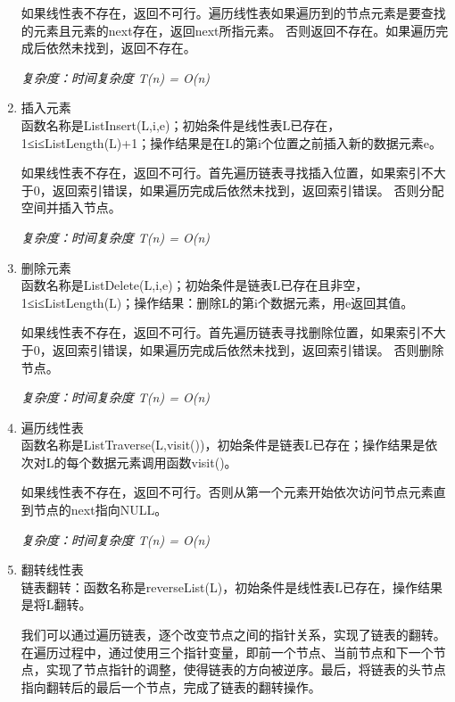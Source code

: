 \documentclass[supercite]{Experimental_Report}
\theoremstyle{definition}
\begin{document}
\begin{enumerate}
	如果线性表不存在，返回不可行。遍历线性表如果遍历到的节点元素是要查找的元素且元素的next存在，返回next所指元素。
	否则返回不存在。如果遍历完成后依然未找到，返回不存在。
	
	\emph{复杂度：时间复杂度 T(n) = O(n)}
	\item 插入元素\\
	函数名称是ListInsert(L,i,e)；初始条件是线性表L已存在，1≤i≤ListLength(L)+1；操作结果是在L的第i个位置之前插入新的数据元素e。
	
	如果线性表不存在，返回不可行。首先遍历链表寻找插入位置，如果索引不大于0，返回索引错误，如果遍历完成后依然未找到，返回索引错误。
	否则分配空间并插入节点。
	
	\emph{复杂度：时间复杂度 T(n) = O(n)}
	\item 删除元素\\
	函数名称是ListDelete(L,i,e)；初始条件是链表L已存在且非空，1≤i≤ListLength(L)；操作结果：删除L的第i个数据元素，用e返回其值。
	
	如果线性表不存在，返回不可行。首先遍历链表寻找删除位置，如果索引不大于0，返回索引错误，如果遍历完成后依然未找到，返回索引错误。
	否则删除节点。
	
	\emph{复杂度：时间复杂度 T(n) = O(n)}
	\item 遍历线性表\\
	函数名称是ListTraverse(L,visit())，初始条件是链表L已存在；操作结果是依次对L的每个数据元素调用函数visit()。
	
	如果线性表不存在，返回不可行。否则从第一个元素开始依次访问节点元素直到节点的next指向NULL。
	
	\emph{复杂度：时间复杂度 T(n) = O(n)}
	\item 翻转线性表\\
	链表翻转：函数名称是reverseList(L)，初始条件是线性表L已存在，操作结果是将L翻转。
	
	我们可以通过遍历链表，逐个改变节点之间的指针关系，实现了链表的翻转。在遍历过程中，通过使用三个指针变量，即前一个节点、当前节点和下一个节点，实现了节点指针的调整，使得链表的方向被逆序。最后，将链表的头节点指向翻转后的最后一个节点，完成了链表的翻转操作。
	

\end{enumerate}
\end{document}

